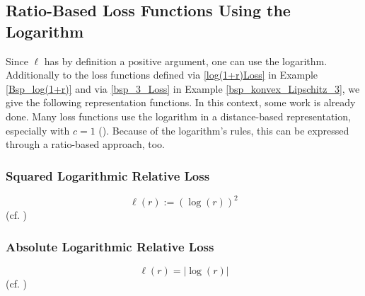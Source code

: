 \documentclass[10pt]{article}
\begin{document}
\subsection{Ratio-Based Loss Functions Using the Logarithm}
Since $\ell$ has by definition a positive argument, one can use the logarithm.
Additionally to the loss functions defined via \eqref{log(1+r)Loss} in Example \ref{Bsp_log(1+r)} and via \eqref{bsp_3_Loss} in Example \ref{bsp_konvex_Lipschitz_3}, we give the following representation functions.
In this context, some work is already done.
Many loss functions use the logarithm in a distance-based representation, especially with $c = 1$ (\cites[Chapter 4.2.9]{CiampiconiEtAl2024}[Chapters III.H, III.I]{JadonEtAl2022}[(9)]{LiEtAl2025}[Chapters 8.1.2, 8.2.3, 8.2.5, 8.2.8]{TervenEtAl2025}).
Because of the logarithm's rules, this can be expressed through a ratio-based approach, too.
\subsubsection{Squared Logarithmic Relative Loss}
\begin{equation} \label{logquadrFehler}
	\ell(r) := (\log(r))^2
\end{equation}
(cf. \cites[Chapter III.H]{JadonEtAl2022}[Chapter 8.1.2]{TervenEtAl2025}[Chapter 3.2]{Eigen2014})
\subsubsection{Absolute Logarithmic Relative Loss}
\begin{equation} \label{logabsFehler}
	\ell(r) = |\log(r)|
\end{equation}
(cf. \cites[Chapter 4.2.9]{CiampiconiEtAl2024}[Chapter III.I]{JadonEtAl2022}[(9)]{LiEtAl2025}[Chapter 8.2.3]{TervenEtAl2025})
\end{document}
